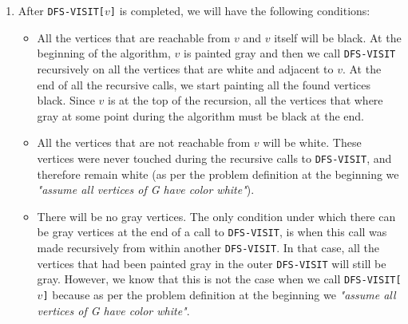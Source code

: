 \documentclass{article}
\begin{document}
\begin{enumerate}[1.]
    \item After \texttt{DFS-VISIT[}$v$\texttt{]} is completed, we will have the following conditions:
    \begin{itemize}
        \item All the vertices that are reachable from $v$ and $v$ itself will be black. At the beginning of the algorithm, $v$ is painted gray and then we call \texttt{DFS-VISIT} recursively on all the vertices that are white and adjacent to $v$. At the end of all the recursive calls, we start painting all the found vertices black. Since $v$ is at the top of the recursion, all the vertices that where gray at some point during the algorithm must be black at the end.
        \item All the vertices that are not reachable from $v$ will be white. These vertices were never touched during the recursive calls to \texttt{DFS-VISIT}, and therefore remain white (as per the problem definition at the beginning we \emph{"assume all vertices of G have color white"}).
        \item There will be no gray vertices. The only condition under which there can be gray vertices at the end of a call to \texttt{DFS-VISIT}, is when this call was made recursively from within another \texttt{DFS-VISIT}. In that case, all the vertices that had been painted gray in the outer \texttt{DFS-VISIT} will still be gray. However, we know that this is not the case when we call \texttt{DFS-VISIT[}$v$\texttt{]} because as per the problem definition at the beginning we \emph{"assume all vertices of G have color white"}. 
    \end{itemize}
    
\end{enumerate}
\end{document}
